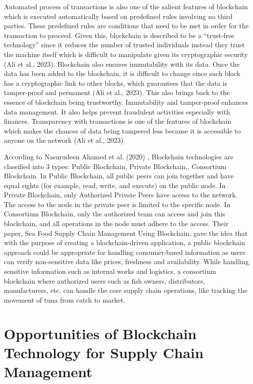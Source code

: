 Automated process of transactions is also one of the salient features of blockchain which is executed automatically based on predefined rules involving no third parties. These predefined rules are conditions that need to be met in order for the transaction to proceed. Given this, blockchain is described to be a “trust-free technology” since it reduces the number of trusted individuals instead they trust the machine itself which is difficult to manipulate given its cryptographic security (Ali et al., 2023)\nocite{rrl-ToB3}. Blockchain also ensures immutability with its data. Once the data has been added to the blockchain, it is difficult to change since each block has a cryptographic link to other blocks, which guarantees that the data is tamper-proof and permanent (Ali et al., 2023)\nocite{rrl-ToB3}. This also brings back to the essence of blockchain being trustworthy. Immutability and tamper-proof enhances data management. It also helps prevent fraudulent activities especially with finances. Transparency with transactions is one of the features of blockchain which makes the chances of data being tampered less because it is accessible to anyone on the network (Ali et al., 2023)\nocite{rrl-ToB3}.

According to Nasurudeen Ahamed et al. (2020) \nocite{rrl-ToB4}, Blockchain technologies are classified into 3 types: Public Blockchain, Private Blockchain,. Consortium Blockchain. In Public Blockchain, all public peers can join together and have equal rights (for example, read, write, and execute) on the public node. In Private Blockchain, only Authorized Private Peers have access to the network. The access to the node in the private peer is limited to the specific node. In Consortium Blockchain, only the authorized team can access and join this blockchain, and all operations in the node must adhere to the access. Their paper, Sea Food Supply Chain Management Using Blockchain, gave the idea that with the purpose of creating a blockchain-driven application, a public blockchain approach could be appropriate for handling consumer-based information as users can verify non-sensitive data like prices, freshness and availability. While handling sensitive information such as internal works and logistics, a consortium blockchain where authorized users such as fish owners, distributors, manufacturers, etc. can handle the core supply chain operations, like tracking the movement of tuna from catch to market.


\section{Opportunities of Blockchain Technology for Supply Chain Management}

